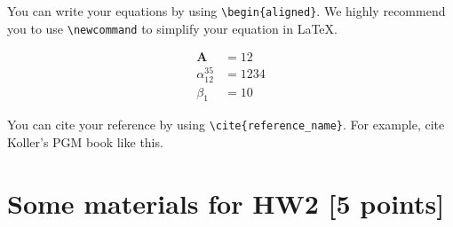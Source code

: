 \documentclass[12pt,a4paper]{article}
\newcommand{\Ab}{\bm{A}}
\begin{document}
You can write your equations by using \verb|\begin{aligned}|.
We highly recommend you to use \verb|\newcommand| to simplify your equation in \LaTeX.

\begin{align}
    \Ab &= 12 \\
    \alpha_{12}^{35} &= 1234 \\
    \beta_1 &= 10
\end{align}

You can cite your reference by using \verb|\cite{reference_name}|.
For example, cite Koller's PGM book \cite{KollerPGM} like this.


\section{Some materials for HW2 [5 points]}
\end{document}

